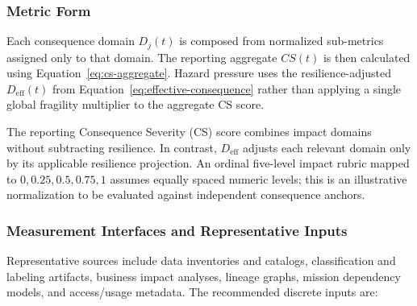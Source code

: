 \documentclass[11pt]{article}
\begin{document}
\subsubsection{Metric Form}
Each consequence domain $D_j(t)$ is composed from normalized sub-metrics assigned only
to that domain. The reporting aggregate $CS(t)$ is then calculated using
Equation~\ref{eq:cs-aggregate}. Hazard pressure uses the resilience-adjusted
$D_{\mathrm{eff}}(t)$ from Equation~\ref{eq:effective-consequence} rather than applying
a single global fragility multiplier to the aggregate CS score.

The reporting Consequence Severity (CS) score combines impact domains
without subtracting resilience. In contrast, $D_{\mathrm{eff}}$ adjusts
each relevant domain only by its applicable resilience projection.
An ordinal five-level impact rubric mapped to $0,0.25,0.5,0.75,1$
assumes equally spaced numeric levels; this is an illustrative
normalization to be evaluated against independent consequence anchors.

\subsubsection{Measurement Interfaces and Representative Inputs}
Representative sources include data inventories and catalogs, classification and
labeling artifacts, business impact analyses, lineage graphs, mission dependency
models, and access/usage metadata. The recommended discrete inputs are:
\end{document}

